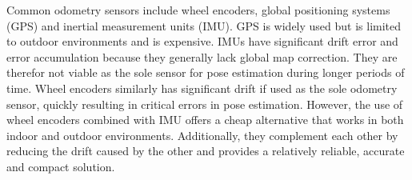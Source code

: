 Common odometry sensors include wheel encoders, global positioning systems (GPS) and inertial measurement units (IMU)\:\cite{khan_investigation_2022}. 
GPS is widely used but is limited to outdoor environments and is expensive\:\cite{khan_investigation_2022}.
IMUs have significant drift error and error accumulation because they generally lack global map correction\:\cite{khan_investigation_2022}\cite{fasiolo_comparing_2023}. They are therefor not viable as the sole sensor for pose estimation during longer periods of time\:\cite{khan_investigation_2022}\cite{fasiolo_comparing_2023}.
Wheel encoders similarly has significant drift if used as the sole odometry sensor, quickly resulting in critical errors in pose estimation\:\cite{cadena_past_2016}.
However, the use of wheel encoders combined with IMU offers a cheap alternative that works in both indoor and outdoor environments\:\cite{khan_investigation_2022}. Additionally, they complement each other by reducing the drift caused by the other and provides a relatively reliable, accurate and compact solution\:\cite{khan_investigation_2022}.

